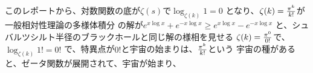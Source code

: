 \documentclass{jsarticle}
\begin{document}
\title{}
\author{}
\date{}
\maketitle

 このレポートから、対数関数の底が$\zeta(s)$で$\log_{\zeta(k)}1=0$
 となり、$\zeta(k)={{\pi^{k}} \over {k!}}$が一般相対性理論の多様体積分
 の解が$e^{x\log x} + e^{-x\log x} \ge e^{x\log x} - e^{-x\log x}$
 と、シュバルツシルト半径のブラックホールと同じ解の様相を見せる
 $\zeta(k)={{\pi^{0}} \over {0!}}$で、$\log_{\zeta(k)}1!=0!$
 で、特異点が$0!$と宇宙の始まりは、${{\pi^{k}}\over {k!}}$という
 宇宙の種があると、ゼータ関数が展開されて、宇宙が始まり、
 
\end{document}
